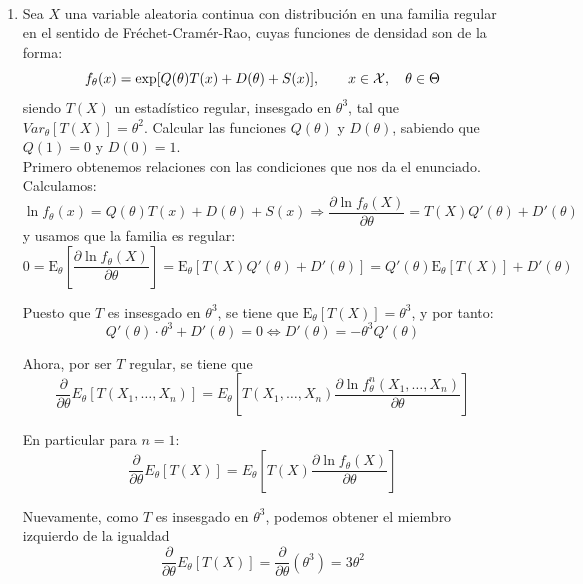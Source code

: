 \documentclass[12pt]{article}
\newcommand{\E}{\mathrm{E}}
\begin{document}
    \begin{ejercicio}[2.25 puntos]~
        \begin{enumerate}[label=\alph*)]
            \item Sea $X$ una variable aleatoria continua con distribución en una familia regular en el sentido de Fréchet-Cramér-Rao, cuyas funciones de densidad son de la forma:
                \begin{equation*}
                    f_\theta(x) = \exp[Q(\theta)T(x) + D(\theta)+S(x)], \qquad x\in \mathcal{X}, \quad \theta\in \Theta
                \end{equation*}
                siendo $T(X)$ un estadístico regular, insesgado en $\theta^3$, tal que $Var_\theta[T(X)] = \theta^2$. Calcular las funciones $Q(\theta)$ y $D(\theta)$, sabiendo que $Q(1)=0$ y $D(0)=1$. \\

                Primero obtenemos relaciones con las condiciones que nos da el enunciado. 
                Calculamos:
                $$\ln f_\theta(x) = Q(\theta) T(x) + D(\theta) + S(x) \Longrightarrow 
                \dfrac{\partial \ln f_\theta(X)}{\partial \theta} = T(X) Q'(\theta) + D'(\theta)$$
                y usamos que la familia es regular:
                $$0 = \E_\theta \left[ \dfrac{\partial \ln f_\theta(X)}{\partial \theta} \right] = \E_\theta \left[ T(X) Q'(\theta) + D'(\theta) \right] = Q'(\theta) \E_\theta \left[ T(X) \right] + D'(\theta)$$

                Puesto que $T$ es insesgado en $\theta^3$, se tiene que $\E_\theta[T(X)] = \theta^3$, y por tanto:
                $$Q'(\theta) \cdot \theta^3 + D'(\theta) = 0 \iff D'(\theta) = - \theta^3 Q'(\theta)$$


                Ahora, por ser $T$ regular, se tiene que
                $$\dfrac{\partial}{\partial \theta} E_\theta[T(X_1, \ldots, X_n)] = E_\theta \left[T(X_1, \ldots, X_n) \dfrac{\partial \ln f_\theta^n (X_1, \ldots, X_n)}
                {\partial \theta} \right]$$
                
                En particular para $n=1$:
                $$\dfrac{\partial}{\partial \theta} E_\theta[T(X)] = E_\theta \left[T(X) \dfrac{\partial \ln f_\theta (X)}
                {\partial \theta} \right]$$

                Nuevamente, como $T$ es insesgado en $\theta^3$, podemos obtener el miembro izquierdo 
                de la igualdad
                $$\dfrac{\partial}{\partial \theta} E_\theta[T(X)] = 
                \dfrac{\partial}{\partial \theta} (\theta^3) = 3 \theta^2$$


\end{enumerate}
\end{ejercicio}
\end{document}

